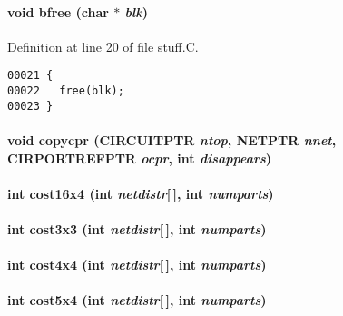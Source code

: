 \paragraph{\setlength{\rightskip}{0pt plus 5cm}void bfree (char $\ast$ {\em blk})}\hfill



Definition at line 20 of file stuff.C.\small\begin{verbatim}00021 {
00022   free(blk);
00023 }
\end{verbatim}\normalsize 
\label{part.h_a20}
\paragraph{\setlength{\rightskip}{0pt plus 5cm}void copycpr (CIRCUITPTR {\em ntop}, NETPTR {\em nnet}, CIRPORTREFPTR {\em ocpr}, int {\em disappears})}\hfill

\label{part.h_a38}
\paragraph{\setlength{\rightskip}{0pt plus 5cm}int cost16x4 (int {\em netdistr}[$\,$], int {\em numparts})}\hfill

\label{part.h_a33}
\paragraph{\setlength{\rightskip}{0pt plus 5cm}int cost3x3 (int {\em netdistr}[$\,$], int {\em numparts})}\hfill

\label{part.h_a34}
\paragraph{\setlength{\rightskip}{0pt plus 5cm}int cost4x4 (int {\em netdistr}[$\,$], int {\em numparts})}\hfill

\label{part.h_a35}
\paragraph{\setlength{\rightskip}{0pt plus 5cm}int cost5x4 (int {\em netdistr}[$\,$], int {\em numparts})}\hfill

